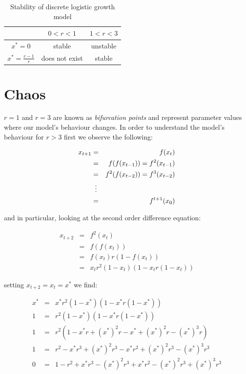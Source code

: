 \documentclass{report}
\begin{document}
\begin{table}[h!]
	\centering
	\bgroup
	\setlength{\tabcolsep}{20pt}
	\def\arraystretch{2}
	\begin{tabular}{ c | c | c }
		                        & $0 < r < 1$    & $1 < r < 3$ \\
		\hline
		$x^* = 0$               & stable         & unstable \\
		\hline
		$x^* = \frac{r - 1}{r}$ & does not exist & stable
	\end{tabular}
    \egroup
	\caption{Stability of discrete logistic growth model}
	\label{table:logit}
\end{table}\medskip




\section{Chaos}

$r = 1$ and $r = 3$ are known as \emph{bifurcation points} and represent parameter values where
our model's behaviour changes. In order to understand the model's behaviour for $r > 3$ first we
observe the following: \bigskip

\begin{eqnarray*}
    x_{t + 1} & = & f(x_t) \\
              & = & f(f(x_{t - 1})) = f^2(x_{t - 1}) \\
              & = & f^2(f(x_{t - 2})) = f^3(x_{t - 2}) \\
              & \mathrel{\makebox[\widthof{=}]{\vdots}} \\
              & = & f^{t + 1}(x_0)
\end{eqnarray*}\medskip

and in particular, looking at the second order difference equation: \bigskip

\begin{eqnarray*}
    x_{t + 2} & = & f^2(x_t) \\
              & = & f(f(x_t)) \\
              & = & f(x_t) r (1 - f(x_t)) \\
              & = & x_t r^2 (1 - x_t) (1 - x_t r (1 - x_t))
\end{eqnarray*}\medskip

setting $x_{t + 2} = x_t = x^*$ we find: \bigskip

\begin{eqnarray*}
     x^* & = & x^* r^2 (1 - x^*) (1 - x^* r (1 - x^*)) \\
       1 & = & r^2 (1 - x^*) (1 - x^* r (1 - x^*)) \\
       1 & = & r^2 (1 - x^* r + (x^*)^2 r - x^* + (x^*)^2 r - (x^*)^3 r) \\
       1 & = & r^2 - x^* r^3 + (x^*)^2 r^3 - x^* r^2 + (x^*)^2 r^3 - (x^*)^3 r^3 \\
       0 & = & 1 - r^2 + x^* r^3 - (x^*)^2 r^3 + x^* r^2 - (x^*)^2 r^3 + (x^*)^3 r^3
\end{eqnarray*}\medskip
\end{document}
